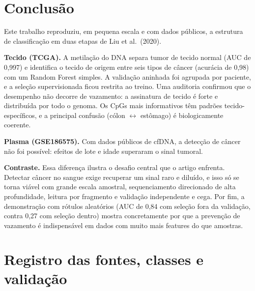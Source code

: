 \documentclass[11pt,a4paper]{article}
\begin{document}
\section{Conclusão}

Este trabalho reproduziu, em pequena escala e com dados públicos, a estrutura de
classificação em duas etapas de Liu et al.~(2020).

\textbf{Tecido (TCGA).} A metilação do DNA separa tumor de tecido normal (AUC de
0,997) e identifica o tecido de origem entre seis tipos de câncer (acurácia de
0,98) com um Random Forest simples. A validação aninhada foi agrupada por
paciente, e a seleção supervisionada ficou restrita ao treino. Uma auditoria
confirmou que o desempenho não decorre de vazamento: a assinatura de tecido é
forte e distribuída por todo o genoma. Os CpGs mais informativos têm padrões
tecido-específicos, e a principal confusão (cólon $\leftrightarrow$ estômago) é biologicamente
coerente.

\textbf{Plasma (GSE186575).} Com dados públicos de cfDNA, a detecção de câncer
não foi possível: efeitos de lote e idade superaram o sinal tumoral.

\textbf{Contraste.} Essa diferença ilustra o desafio central que o artigo
enfrenta. Detectar câncer no sangue exige recuperar um sinal raro e diluído, e
isso só se torna viável com grande escala amostral, sequenciamento direcionado
de alta profundidade, leitura por fragmento e validação independente e cega. Por
fim, a demonstração com rótulos aleatórios (AUC de 0,84 com seleção fora da
validação, contra 0,27 com seleção dentro) mostra concretamente por que a
prevenção de vazamento é indispensável em dados com muito mais features do que
amostras.

\section*{Registro das fontes, classes e validação}
\end{document}
